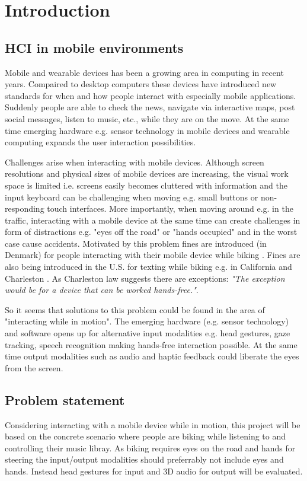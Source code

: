 \chapter{Introduction}
\section{HCI in mobile environments}
Mobile and wearable devices has been a growing area in computing in recent years. Compaired to desktop computers these devices have introduced new standards for when and how people interact with especially mobile applications. Suddenly people are able to check the news, navigate via interactive maps, post social messages, listen to music, etc., while they are on the move. At the same time emerging hardware e.g. sensor technology in mobile devices and wearable computing expands the user interaction possibilities.

Challenges arise when interacting with mobile devices. Although screen resolutions and physical sizes of mobile devices are increasing, the visual work space is limited i.e. screens easily becomes cluttered with information and the input keyboard can be challenging when moving e.g. small buttons or non-responding touch interfaces. More importantly, when moving around e.g. in the traffic, interacting with a mobile device at the same time can create challenges in form of distractions e.g. "eyes off the road" or "hands occupied" and in the worst case cause accidents. Motivated by this problem fines are introduced (in Denmark) for people interacting with their mobile device while biking \cite{cyklistforbundet_bodetakster_2014}. Fines are also being introduced in the U.S. for texting while biking e.g. in California \cite{_there_2011} and Charleston \cite{beahm/staff_charleston_2013}. As Charleston law suggests there are exceptions: \textit{"The exception would be for a device that can be worked hands-free."}.

So it seems that solutions to this problem could be found in the area of "interacting while in motion". The emerging hardware (e.g. sensor technology) and software opens up for alternative input modalities e.g. head gestures, gaze tracking, speech recognition making hands-free interaction possible. At the same time output modalities such as audio and haptic feedback could liberate the eyes from the screen.

\section{Problem statement}
Considering interacting with a mobile device while in motion, this project will be based on the concrete scenario where people are biking while listening to and controlling their music libray. As biking requires eyes on the road and hands for steering the input/output modalities should preferrably not include eyes and hands. Instead head gestures for input and 3D audio for output will be evaluated.

